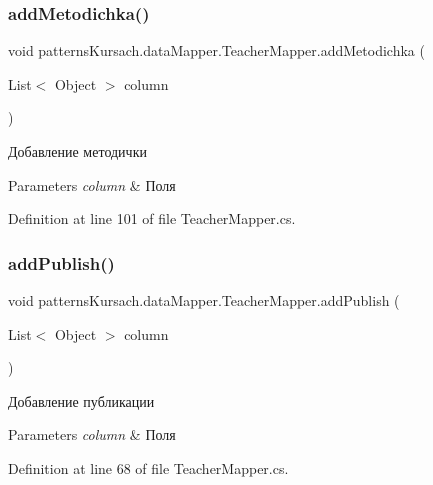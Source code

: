 \subsubsection{\texorpdfstring{add\+Metodichka()}{addMetodichka()}}
{\footnotesize\ttfamily void patterns\+Kursach.\+data\+Mapper.\+Teacher\+Mapper.\+add\+Metodichka (\begin{DoxyParamCaption}\item[{List$<$ Object $>$}]{column }\end{DoxyParamCaption})}



Добавление методички 


\begin{DoxyParams}{Parameters}
{\em column} & Поля\\
\hline
\end{DoxyParams}


Definition at line 101 of file Teacher\+Mapper.\+cs.

\mbox{\label{classpatterns_kursach_1_1data_mapper_1_1_teacher_mapper_ab509a0e07dc0a043e8614175fb37f5a4}} 
\subsubsection{\texorpdfstring{add\+Publish()}{addPublish()}}
{\footnotesize\ttfamily void patterns\+Kursach.\+data\+Mapper.\+Teacher\+Mapper.\+add\+Publish (\begin{DoxyParamCaption}\item[{List$<$ Object $>$}]{column }\end{DoxyParamCaption})}



Добавление публикации 


\begin{DoxyParams}{Parameters}
{\em column} & Поля\\
\hline
\end{DoxyParams}


Definition at line 68 of file Teacher\+Mapper.\+cs.

\mbox{\label{classpatterns_kursach_1_1data_mapper_1_1_teacher_mapper_adf54d72dc8d837244868aacc3cd2c3a3}} 
